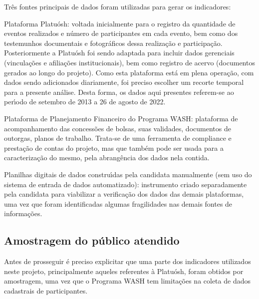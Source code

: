 \documentclass[
12pt,		%
openright,	%
twoside,  %
a4paper,			%
chapter=TITLE,		%
english,			%
french,				%
spanish,			%
brazil				%
]{USPSC-classe/USPSC}
\begin{document}
Tr\^es fontes principais de dados foram utilizadas para gerar os indicadores:










\begin{alineas}
\item Plataforma Platu\'osh: voltada inicialmente para o registro da quantidade de eventos realizados e n\'umero de participantes em cada evento, bem como dos testemunhos documentais e fotogr\'aficos dessa realiza\c{c}\~ao e participa\c{c}\~ao. Posteriormente a Platu\'osh foi sendo adaptada para incluir dados gerenciais (vincula\c{c}\~oes e afilia\c{c}\~oes institucionais), bem como registro de acervo (documentos gerados ao longo do projeto). Como esta plataforma est\'a em plena opera\c{c}\~ao, com dados sendo adicionados diariamente, foi preciso escolher um recorte temporal para a presente an\'alise. Desta forma, os dados aqui presentes referem-se ao per\'{\i}odo de setembro de 2013 a 26 de agosto de 2022.
\item Plataforma de Planejamento Financeiro do Programa WASH: plataforma de acompanhamento das concess\~oes de bolsas, suas validades, documentos de outorgas, planos de trabalho. Trata-se de uma ferramenta de compliance e presta\c{c}\~ao de contas do projeto, mas que tamb\'em pode ser usada para a caracteriza\c{c}\~ao do mesmo, pela abrang\^encia dos dados nela contida.
\item Planilhas digitais de dados constru\'{\i}das pela candidata manualmente (sem uso do sistema de entrada de dados automatizado): instrumento criado separadamente pela candidata para viabilizar a verifica\c{c}\~ao dos dados das demais plataformas, uma vez que foram identificadas algumas fragilidades nas demais fontes de informa\c{c}\~oes.
\end{alineas}

\subsection[Amostragem do p\'ublico atendido]{Amostragem do p\'ublico atendido}\label{Amostragem do p\'ublico atendido}
Antes de prosseguir \'e preciso explicitar que uma parte dos indicadores utilizados neste projeto, principalmente aqueles referentes \`a Platu\'osh, foram obtidos por amostragem, uma vez que o Programa WASH tem limita\c{c}\~oes na coleta de dados cadastrais de participantes.
\end{document}
